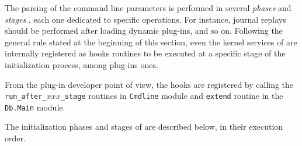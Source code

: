The parsing of the command line parameters is performed in several
\emph{phases} and \emph{stages}
, 
each one dedicated to specific operations. For instance,
journal replays should be performed after loading dynamic plug-ins, and so
on. Following the general rule stated at the beginning of this section, even
the kernel services of \framac are internally registered as hooks routines to
be executed at a specific stage of the initialization process, among plug-ins
ones.

From the plug-in developer point of view, the hooks are registered by
calling the \texttt{run\_after\_$xxx$\_stage} routines in
\texttt{Cmdline} module and \texttt{extend} routine
in the \texttt{Db.Main} module.

The initialization phases and stages of \framac are described below, in
their execution order.

